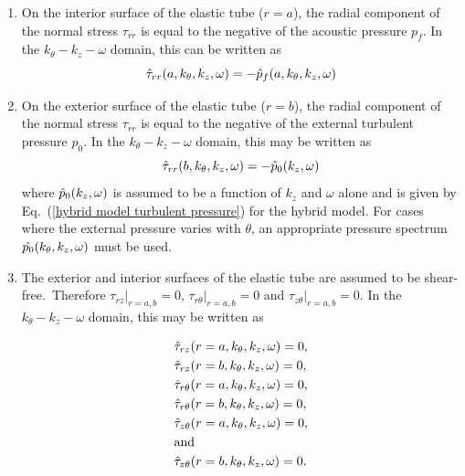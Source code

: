 \documentclass[11pt,cleanfoot]{asme2ej}
\begin{document}
\begin{enumerate}
    \item On the interior surface of the elastic tube ($r=a$), the radial component of the normal stress $\tau_{rr}$ is equal to the negative of the acoustic pressure $p_f$. In the $k_\theta-k_z-\omega$ domain, this can be written as
    \begin{equation}\label{BC1 3d}
       \Hat{\tau}_{rr}(a,k_\theta,k_{z},\omega) = -\Hat{p}_{f}(a,k_\theta,k_{z},\omega) 
    \end{equation}

    \item On the exterior surface of the elastic tube ($r=b$), the radial component of the normal stress $\tau_{rr}$ is equal to the negative of the external turbulent pressure $p_0$. In the $k_\theta-k_z-\omega$ domain, this may be written as
    \begin{equation}\label{BC2 3d}
        \Hat{\tau}_{rr}(b,k_\theta,k_{z},\omega)= -\Hat{p}_{0}(k_{z},\omega)
    \end{equation}
     where $\Hat{p}_{0}(k_z,\omega)$ is assumed to be a function of $k_z$ and $\omega$ alone and is given by Eq.~(\ref{hybrid model turbulent pressure}) for the hybrid model. For cases where the external pressure varies with $\theta$, an appropriate pressure spectrum $\Hat{p_0}(k_\theta,k_z,\omega)$ must be used.

     \item The exterior and interior surfaces of the elastic tube are assumed to be shear-free.~Therefore $\tau_{rz}|_{r=a,b} = 0$, $\tau_{r\theta}|_{r=a,b} = 0$ and $\tau_{z\theta}|_{r=a,b} = 0$. In the $k_\theta-k_z-\omega$ domain, this may be written as
     
     \begin{align}
    &\Hat{\tau}_{rz}(r=a,k_\theta,k_z,\omega) = 0 \label{BC3 3d}, \\
    &\Hat{\tau}_{rz}(r=b,k_\theta,k_z,\omega) = 0 \label{BC4 3d}, \\
    &\Hat{\tau}_{r\theta}(r=a,k_\theta,k_z,\omega) = 0 \label{BC5 3d}, \\
    &\Hat{\tau}_{r\theta}(r=b,k_\theta,k_z,\omega) = 0 \label{BC6 3d}, \\
    &\Hat{\tau}_{z\theta}(r=a,k_\theta,k_z,\omega) = 0 \label{BC7 3d}, \\
    &\text{and} \nonumber \\
    &\Hat{\tau}_{z\theta}(r=b,k_\theta,k_z,\omega) = 0 \label{BC8 3d}.
\end{align}


\end{enumerate}
\end{document}

